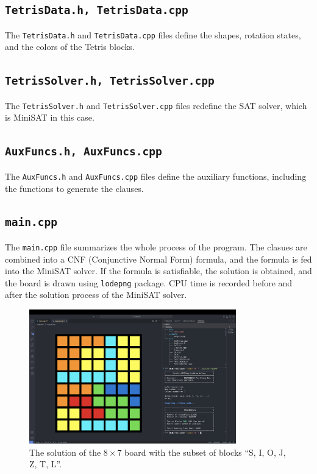 \documentclass[12pt, a4paper]{article}
\theoremstyle{mystyle}
\begin{document}
        \subsection{\texttt{TetrisData.h, TetrisData.cpp}}
        The \texttt{TetrisData.h} and \texttt{TetrisData.cpp} files define the shapes, rotation states, and the colors of the Tetris blocks.
        \subsection{\texttt{TetrisSolver.h, TetrisSolver.cpp}}
        The \texttt{TetrisSolver.h} and \texttt{TetrisSolver.cpp} files redefine the \textsf{SAT} solver, which is \textsf{MiniSAT} in this case.
        \subsection{\texttt{AuxFuncs.h, AuxFuncs.cpp}}
        The \texttt{AuxFuncs.h} and \texttt{AuxFuncs.cpp} files define the auxiliary functions, including the functions to generate the clauses.
        \subsection{\texttt{main.cpp}}
        The \texttt{main.cpp} file summarizes the whole process of the program. The clasues are combined into a \textsf{CNF} (Conjunctive Normal Form) formula, and the formula is fed into the \textsf{MiniSAT} solver. If the formula is satisfiable, the solution is obtained, and the board is drawn using \texttt{lodepng} package. CPU time is recorded before and after the solution process of the \textsf{MiniSAT} solver.
        \begin{figure}[H]
            \centering
            \includegraphics[width=0.8\textwidth]{Implementation.png}
            \caption{The solution of the $8\times 7$ board with the subset of blocks ``S, I, O, J, Z, T, L''.}
        \end{figure}
\end{document}
